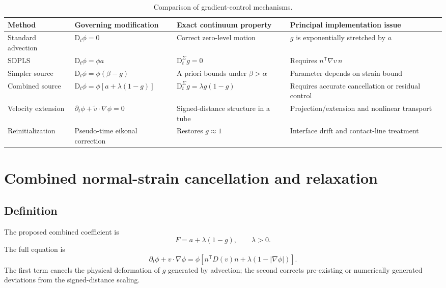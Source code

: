 \documentclass[11pt,a4paper]{article}
\theoremstyle{definition}
\theoremstyle{remark}
\newcommand{\abs}[1]{\left\lvert #1\right\rvert}
\newcommand{\material}{\mathrm{D}_t}
\begin{document}
\begin{table}[htbp]
\centering
\caption{Comparison of gradient-control mechanisms.}
\label{tab:comparison}
\small
\begin{tabularx}{\textwidth}{@{}p{}p{}X X@{}}
\toprule
Method & Governing modification & Exact continuum property & Principal implementation issue \\
\midrule
Standard advection & $\material\phi=0$ & Correct zero-level motion & $g$ is exponentially stretched by $a$ \\
SDPLS & $\material\phi=\phi a$ & $\material^\Sigma g=0$ & Requires $n^{\mathsf T}\nabla v\,n$ \\
Simpler source & $\material\phi=\phi(\beta-g)$ & A priori bounds under $\beta>\alpha$ & Parameter depends on strain bound \\
Combined source & $\material\phi=\phi[a+\lambda(1-g)]$ & $\material^\Sigma g=\lambda g(1-g)$ & Requires accurate cancellation or residual control \\
Velocity extension & $\partial_t\phi+\widetilde v\cdot\nabla\phi=0$ & Signed-distance structure in a tube & Projection/extension and nonlinear transport \\
Reinitialization & Pseudo-time eikonal correction & Restores $g\approx1$ & Interface drift and contact-line treatment \\
\bottomrule
\end{tabularx}
\end{table}

\section{Combined normal-strain cancellation and relaxation}

\subsection{Definition}

The proposed combined coefficient is
\begin{equation}
  F=a+\lambda(1-g),
  \qquad \lambda>0.
  \label{eq:combined-F}
\end{equation}
The full equation is
\begin{equation}
  \boxed{
  \partial_t\phi+v\cdot\nabla\phi
  =\phi\left[n^{\mathsf T}D(v)n+\lambda\left(1-\abs{\nabla\phi}\right)\right].
  }
  \label{eq:combined-PDE}
\end{equation}
The first term cancels the physical deformation of $g$ generated by advection; the second corrects pre-existing or numerically generated deviations from the signed-distance scaling.
\end{document}
